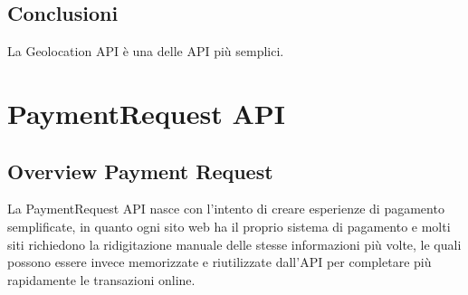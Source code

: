 \documentclass[11pt ,a4paper , twoside , openright ]{article}
\begin{document}
\subsection{Conclusioni}
La Geolocation API è una delle API più semplici.

\cleardoublepage
\newpage
\section{PaymentRequest API}

\subsection{Overview Payment Request}
La PaymentRequest API nasce con l'intento di creare esperienze di pagamento semplificate, in quanto ogni sito web ha il proprio sistema di pagamento e molti siti richiedono la ridigitazione manuale delle stesse informazioni più volte, le quali possono essere invece memorizzate e riutilizzate dall'API per completare più rapidamente le transazioni online.
\end{document}
